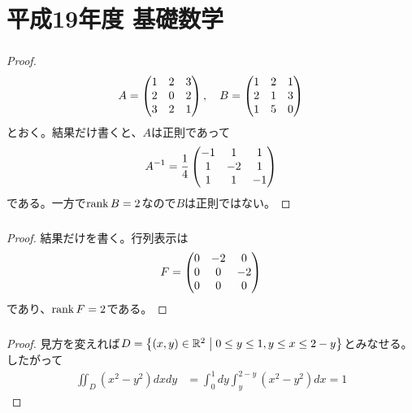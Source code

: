 \section{平成19年度 基礎数学}

\subsubsection{}%
\begin{proof}
  \[
  A = \begin{pmatrix}  1 &2& 3 \\ 2& 0& 2 \\ 3& 2& 1 \end{pmatrix}, \quad B = \begin{pmatrix} 1 &2& 1 \\ 2& 1& 3 \\ 1& 5& 0 \end{pmatrix}
  \]
  とおく。結果だけ書くと、$A$は正則であって
  \[
  A^{-1} = \frac{1}{4} \begin{pmatrix} -1& 1& 1 \\ 1& -2& 1 \\ 1& 1 &-1  \end{pmatrix}
  \]
  である。一方で$\operatorname{rank} B = 2$なので$B$は正則ではない。
\end{proof}

\newpage

\subsubsection{}%
\begin{proof}
  結果だけを書く。行列表示は
  \[
  F = \begin{pmatrix} 0 &-2& 0 \\ 0& 0& -2 \\ 0& 0& 0  \end{pmatrix}
  \]
  であり、$\operatorname{rank} F = 2$である。
\end{proof}

\newpage


\subsubsection{}%
\begin{proof}
  見方を変えれば$D = \left\{ (x,y) \in {\mathbb R}^2 \mathrel{} \middle| \mathrel{} 0 \leq y \leq 1, y \leq x \leq 2 -y \right\}$とみなせる。したがって
  \begin{align*}
    \iint_D (x^2 - y^2) dx dy &= \int_0^1 dy \int_y^{2-y} (x^2 - y^2) dx = 1
  \end{align*}
\end{proof}

